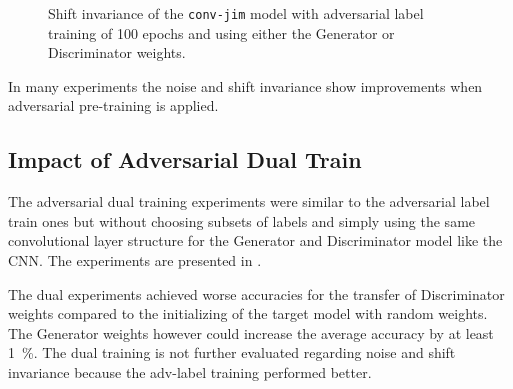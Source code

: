 \FloatBarrier
\noindent
\begin{figure}[!ht]
  \centering
  \quad
  \caption{Shift invariance of the \texttt{conv-jim} model with adversarial label training of 100 epochs and using either the Generator or Discriminator weights.}
  \label{fig:exp_adv_label_tb_shift_conv-jim}
\end{figure}
\FloatBarrier
\noindent
In many experiments the noise and shift invariance show improvements when adversarial pre-training is applied. 



\subsection{Impact of Adversarial Dual Train}
The adversarial dual training experiments were similar to the adversarial label train ones but without choosing subsets of labels and simply using the same convolutional layer structure for the Generator and Discriminator model like the CNN.
The experiments are presented in .

The dual experiments achieved worse accuracies for the transfer of Discriminator weights compared to the initializing of the target model with random weights.
The Generator weights however could increase the average accuracy by at least \SI{1}{\percent}.
The dual training is not further evaluated regarding noise and shift invariance because the adv-label training performed better.